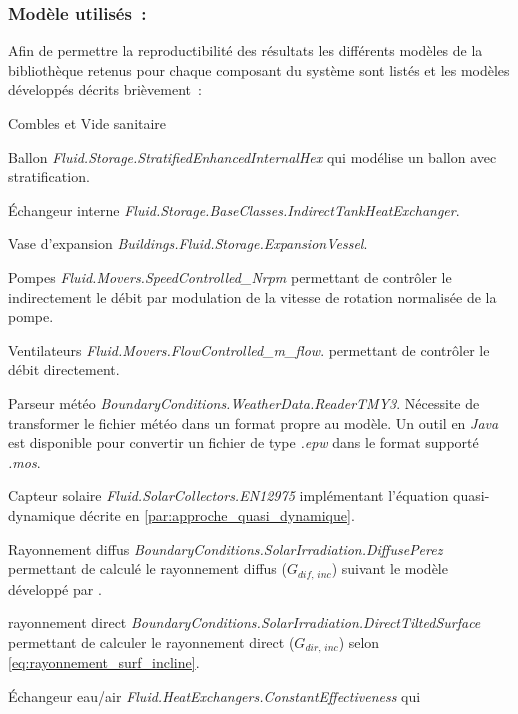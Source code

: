 \subsubsection{Modèle utilisés~:} %
\label{ssub:modele_utilises}
Afin de permettre la reproductibilité des résultats les différents
modèles de la bibliothèque 
retenus pour chaque composant du système sont listés et les modèles développés
décrits brièvement~:
\begin{blockdescription}{Combles et Vide sanitaire}
    \item [Ballon] \textit{Fluid.Storage.StratifiedEnhancedInternalHex} qui modélise
                   un ballon avec stratification.
    \item [Échangeur interne] \textit{Fluid.Storage.BaseClasses.IndirectTankHeatExchanger}.
    \item [Vase d’expansion] \textit{Buildings.Fluid.Storage.ExpansionVessel}.
    \item [Pompes] \textit{Fluid.Movers.SpeedControlled\_Nrpm} permettant
                   de contrôler le indirectement le débit par modulation de la vitesse
                   de rotation normalisée de la pompe.
    \item [Ventilateurs] \textit{Fluid.Movers.FlowControlled\_m\_flow}.
                          permettant de contrôler le débit directement.
    \item [Parseur météo] \textit{BoundaryConditions.WeatherData.ReaderTMY3}.
                          Nécessite de transformer le fichier météo dans un format propre au modèle.
                          Un outil en \textit{Java} est disponible pour convertir un fichier de
                          type \textit{.epw} dans le format supporté \textit{.mos}.
    \item [Capteur solaire] \textit{Fluid.SolarCollectors.EN12975} implémentant
          l’équation quasi-dynamique décrite en \ref{par:approche_quasi_dynamique}.
    \item [Rayonnement diffus] \textit{BoundaryConditions.SolarIrradiation.DiffusePerez} permettant
          de calculé le rayonnement diffus ($G_{dif,\,inc}$) suivant le modèle développé par \textcite{Perez1990271}.
    \item [rayonnement direct] \textit{BoundaryConditions.SolarIrradiation.DirectTiltedSurface}
          permettant de calculer le rayonnement direct ($G_{dir,\,inc}$) selon \eqref{eq:rayonnement_surf_incline}.
    \item [Échangeur eau/air] \textit{Fluid.HeatExchangers.ConstantEffectiveness} qui

\end{blockdescription}
